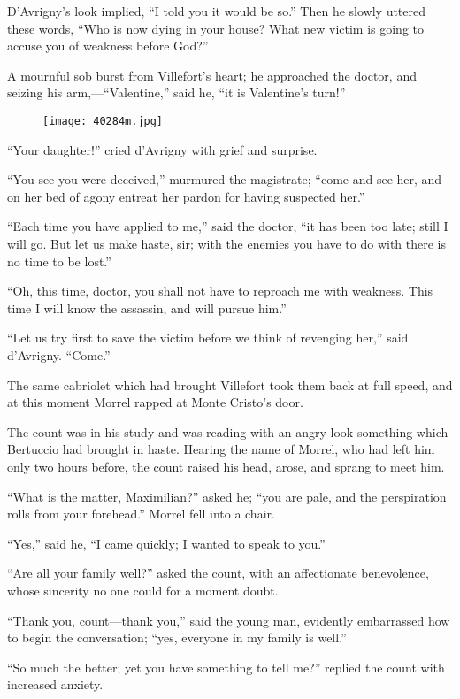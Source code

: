 D’Avrigny’s look implied, “I told you it would be so.” Then he slowly
uttered these words, “Who is now dying in your house? What new victim
is going to accuse you of weakness before God?”

A mournful sob burst from Villefort’s heart; he approached the doctor,
and seizing his arm,—“Valentine,” said he, “it is Valentine’s turn!”

\begin{figure}[ht]
\texttt{[image: 40284m.jpg]}
\end{figure}

“Your daughter!” cried d’Avrigny with grief and surprise.

“You see you were deceived,” murmured the magistrate; “come and see
her, and on her bed of agony entreat her pardon for having suspected
her.”

“Each time you have applied to me,” said the doctor, “it has been too
late; still I will go. But let us make haste, sir; with the enemies you
have to do with there is no time to be lost.”

“Oh, this time, doctor, you shall not have to reproach me with
weakness. This time I will know the assassin, and will pursue him.”

“Let us try first to save the victim before we think of revenging her,”
said d’Avrigny. “Come.”

The same cabriolet which had brought Villefort took them back at full
speed, and at this moment Morrel rapped at Monte Cristo’s door.

The count was in his study and was reading with an angry look something
which Bertuccio had brought in haste. Hearing the name of Morrel, who
had left him only two hours before, the count raised his head, arose,
and sprang to meet him.

“What is the matter, Maximilian?” asked he; “you are pale, and the
perspiration rolls from your forehead.” Morrel fell into a chair.

“Yes,” said he, “I came quickly; I wanted to speak to you.”

“Are all your family well?” asked the count, with an affectionate
benevolence, whose sincerity no one could for a moment doubt.

“Thank you, count—thank you,” said the young man, evidently embarrassed
how to begin the conversation; “yes, everyone in my family is well.”

“So much the better; yet you have something to tell me?” replied the
count with increased anxiety.

